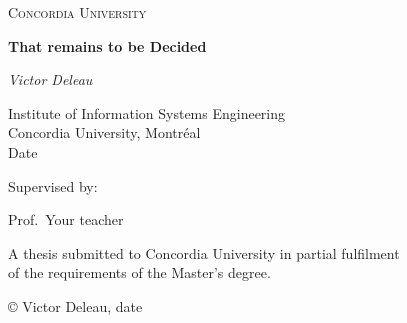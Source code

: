\documentclass[../thesis.tex]{subfiles}
\begin{document}
\begin{titlepage}
	\centering
	\vspace{1cm}
	{\scshape\Large Concordia University\par}
	\vspace{1.5cm}
	{\huge\bfseries That remains to be Decided\par}
	\vspace{2cm}
	{\Large\itshape Victor Deleau\par}
	\vspace{1cm}
	{\large Institute of Information Systems Engineering\\
		Concordia University, Montréal\\
		Date\par}
	\vspace{1.5cm}
	Supervised by:\par
	Prof.~Your teacher \textsc{}

	\vfill
	{A thesis submitted to Concordia University in partial fulfilment\\of the requirements of the Master's degree.\par}
	\vfill

	{© Victor Deleau, date\par}
\end{titlepage}
\end{document}
